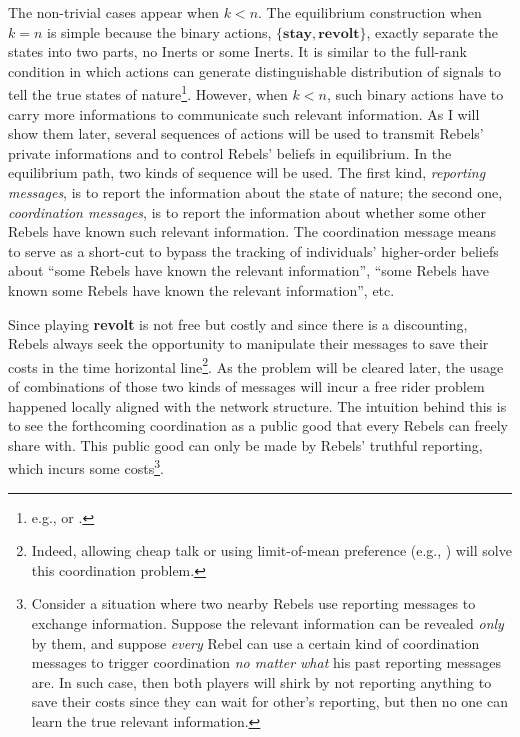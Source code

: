 \documentclass[12pt,letter]{article}
\theoremstyle{definition}
\theoremstyle{remark}
\theoremstyle{claim}
\begin{document}
The non-trivial cases appear when $k<n$. The equilibrium construction when $k=n$ is simple because the binary actions, $\{\textbf{stay},\textbf{revolt}\}$, exactly separate the states into two parts, no Inerts or some Inerts. It is similar to the full-rank condition in which actions can generate distinguishable distribution of signals to tell the true states of nature\footnote{e.g., \citep{Fudenberg2010} or \citep{Fudenberg2011}.}. However, when $k<n$, such binary actions have to carry more informations to communicate such relevant information. As I will show them later, several sequences of actions will be used to transmit Rebels' private informations and to control Rebels' beliefs in equilibrium. In the equilibrium path, two kinds of sequence will be used. The first kind, \textit{reporting messages}, is to report the information about the state of nature; the second one, \textit{coordination messages}, is to report the information about whether some other Rebels have known such relevant information. The coordination message means to serve as a short-cut to bypass the tracking of individuals' higher-order beliefs about ``some Rebels have known the relevant information'', ``some Rebels have known some Rebels have known the relevant information'', etc.

Since playing \textbf{revolt} is not free but costly and since there is a discounting, Rebels always seek the opportunity to manipulate their messages to save their costs in the time horizontal line\footnote{Indeed, allowing cheap talk or using limit-of-mean preference (e.g., \citep{Renault1998}) will solve this coordination problem.}. As the problem will be cleared later, the usage of combinations of those two kinds of messages will incur a free rider problem happened locally aligned with the network structure. The intuition behind this is to see the forthcoming coordination as a public good that every Rebels can freely share with. This public good can only be made by Rebels' truthful reporting, which incurs some costs\footnote{Consider a situation where two nearby Rebels use reporting messages to exchange information. Suppose the relevant information can be revealed \textit{only} by them, and suppose \textit{every} Rebel can use a certain kind of coordination messages to trigger coordination \textit{no matter what} his past reporting messages are. In such case, then both players will shirk by not reporting anything to save their costs since they can wait for other's reporting, but then no one can learn the true relevant information.}.
\end{document}
